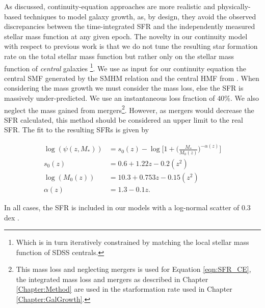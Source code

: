 As discussed, continuity-equation approaches are more realistic and physically-based techniques to model galaxy growth, as, by design, they avoid the observed discrepancies between the time-integrated SFR and the independently measured stellar mass function at any given epoch. The novelty in our continuity model with respect to previous work is that we do not tune the resulting star formation rate on the total stellar mass function but rather only on the stellar mass function of \textit{central} galaxies \footnote{Which is in turn iteratively constrained by matching the local stellar mass function of SDSS centrals.}. We use as input for our continuity equation the central SMF generated by the SMHM relation and the central HMF from \cite{Tinker2010THETESTS}. When considering the mass growth we must consider the mass loss, else the SFR is massively under-predicted. We use an instantaneous loss fraction of $40\%$. We also neglect the mass gained from mergers\footnote{This mass loss and neglecting mergers is used for Equation \ref{eqn:SFR_CE}, the integrated mass loss and mergers as described in Chapter \ref{Chapter:Method} are used in the starformation rate used in Chapter \ref{Chapter:GalGrowth}.}. However, as mergers would decrease the SFR calculated, this method should be considered an upper limit to the real SFR. The fit to the resulting SFRs is given by

\begin{equation}
\begin{split}
\label{eqn:SFR_CE}
\log(\psi(z, M_*)) &= s_0(z) - \log \Big[ 1 + \Big(\frac{M_*}{M_0(z)}\Big)^{-\alpha(z)}\Big] \\
s_0(z) &= 0.6 + 1.22z - 0.2(z^2) \\
\log(M_0(z)) &= 10.3 + 0.753z - 0.15(z^2) \\
\alpha(z) &= 1.3 - 0.1z.
\end{split}
\end{equation}

In all cases, the SFR is included in our models with a log-normal scatter of 0.3 dex \citep{Leja2015ReconcilingFunction}.


